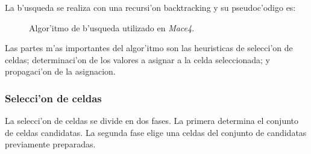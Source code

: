 La b'usqueda se realiza con una recursi'on backtracking y su pseudoc'odigo es:

\begin{figure}[htbp]
\caption{Algor'itmo de b'usqueda utilizado en \textit{Mace4}.}
\label{fig:mace4_busqueda}
\end{figure}

Las partes m'as importantes del algor'itmo son las heuristicas de selecci'on de celdas; determinaci'on de los valores a asignar a la celda seleccionada; y propagaci'on de la asignacion.

\subsubsection{Selecci'on de celdas}

La selecci'on de celdas se divide en dos fases. La primera determina el conjunto de celdas candidatas. La segunda fase elige una celdas del conjunto de candidatas previamente preparadas.

